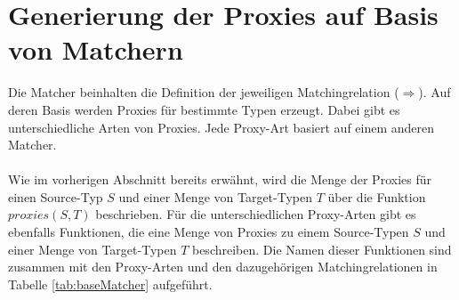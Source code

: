 \documentclass[a4paper,12pt]{article}
\begin{document}
\section{Generierung der Proxies auf Basis von Matchern}
Die Matcher beinhalten die Definition der jeweiligen Matchingrelation ($\Rightarrow$). Auf deren Basis werden Proxies für bestimmte Typen erzeugt. Dabei gibt es unterschiedliche Arten von Proxies. Jede Proxy-Art basiert auf einem anderen Matcher.\\\\
Wie im vorherigen Abschnitt bereits erwähnt, wird die Menge der Proxies für einen Source-Typ $S$ und einer Menge von Target-Typen $T$ über die Funktion $\mathit{proxies(S,T)}$ beschrieben. Für die unterschiedlichen Proxy-Arten gibt es ebenfalls Funktionen, die eine Menge von Proxies zu einem Source-Typen $S$ und einer Menge von Target-Typen $T$ beschreiben. Die Namen dieser Funktionen sind zusammen mit den Proxy-Arten und den dazugehörigen Matchingrelationen in Tabelle \ref{tab:baseMatcher} aufgeführt.
\end{document}
